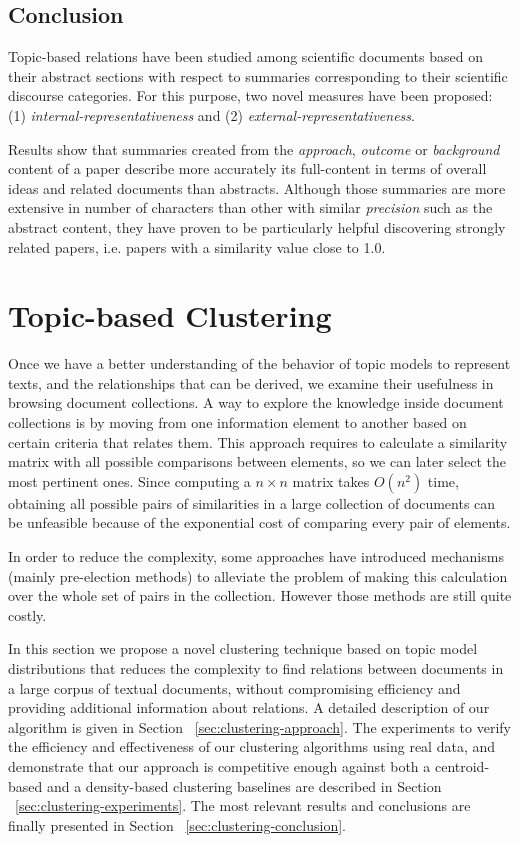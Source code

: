 \subsection{Conclusion}
Topic-based relations have been studied among scientific documents based on their abstract sections with respect to summaries corresponding to their scientific discourse categories. For this purpose, two novel measures have been proposed: (1) \textit{internal-representativeness} and (2) \textit{external-representativeness}.

Results show that summaries created from the \textit{approach}, \textit{outcome} or \textit{background} content of a paper describe more accurately its full-content in terms of overall ideas and related documents than abstracts. Although those summaries are more extensive in number of characters than other with similar \textit{precision} such as the abstract content, they have proven to be particularly helpful  discovering strongly related papers, i.e. papers with a similarity value close to 1.0.


\section{Topic-based Clustering}
\label{sec:topic-clustering}

Once we have a better understanding of the behavior of topic models to represent texts, and the relationships that can be derived, we examine their usefulness in browsing document collections. A way to explore the knowledge inside document collections is by moving from one information element to another based on certain criteria that relates them. This approach requires to calculate a similarity matrix with all possible comparisons between elements, so we can later select the most pertinent ones. Since computing a $n \times n$ matrix takes $O(n^2)$ time, obtaining all possible pairs of similarities in a large collection of documents can be unfeasible because of the exponential cost of comparing every pair of elements.

In order to reduce the complexity, some approaches have introduced mechanisms (mainly pre-election methods) to alleviate the problem of making this calculation over the whole set of pairs in the collection. However those methods are still quite costly.

In this section we propose a novel clustering technique based on topic model distributions that reduces the complexity to find relations between documents in a large corpus of textual documents, without compromising efficiency and providing additional information about relations. A detailed description of our algorithm is given in Section ~\ref{sec:clustering-approach}. The experiments to verify the efficiency and effectiveness of our clustering algorithms using real data, and demonstrate that our approach is competitive enough against both a centroid-based and a density-based clustering baselines are described in Section ~\ref{sec:clustering-experiments}. The most relevant results and conclusions are finally presented in Section ~\ref{sec:clustering-conclusion}.

